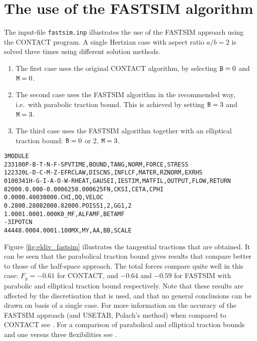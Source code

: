 \documentclass[12pt]{report}
\begin{document}
\section{The use of the FASTSIM algorithm}
\label{sec:ex_fastsim}

The input-file {\tt fastsim.inp} illustrates the use of the FASTSIM
approach using the CONTACT program. A single Hertzian case with aspect
ratio $a/b=2$ is solved three times using different solution methods.
\begin{enumerate}
\item The first case uses the original CONTACT algorithm, by selecting
        ${\tt B}=0$ and ${\tt M}=0$.
\item The second case uses the FASTSIM algorithm in the recommended way,
        i.e.\ with parabolic traction bound. This is achieved by setting
        ${\tt B}=3$ and ${\tt M}=3$.
\item The third case uses the FASTSIM algorithm together with an elliptical
        traction bound: ${\tt B}=0$ or 2, ${\tt M}=3$.
\end{enumerate}
\begin{alltt}\small
% second case: FASTSIM algorithm, parabolical traction bound (M=3, B=3)

 3 MODULE
  233100     P-B-T-N-F-S        PVTIME, BOUND , TANG  , NORM , FORCE, STRESS
  122320     L-D-C-M-Z-E        FRCLAW, DISCNS, INFLCF, MATER, RZNORM, EXRHS
 0100341   H-G-I-A-O-W-R  HEAT, GAUSEI, IESTIM, MATFIL, OUTPUT, FLOW, RETURN
   82000.     0.000     -0.000625   0.000625        FN, CKSI, CETA, CPHI
   0.000      0.400      30000.                     CHI, DQ, VELOC
   0.280      0.280      82000.     82000.          POISS 1,2,  GG 1,2
   1.000      1.000      1.000                      K0_MF,ALFAMF,BETAMF
   -3                                               IPOTCN
   44   44     8.000      4.000      1.100          MX,MY,AA,BB,SCALE
\end{alltt}
Figure \ref{fig:eldiv_fastsim} illustrates the tangential tractions that
are obtained. It can be seen that the parabolical traction bound gives
results that compare better to those of the half-space approach. The total
forces compare quite well in this case: $F_y=-0.61$ for CONTACT, and
$-0.64$ and $-0.59$ for FASTSIM with parabolic and elliptical traction bound
respectively. Note that these results are affected by the discretisation
that is used, and that no general conclusions can be drawn on basis of a
single case. For more information on the accuracy of the FASTSIM approach
(and USETAB, Polach's method) when compared to CONTACT see
\cite{Vollebregt2011a-assessm}. For a comparison of parabolical and elliptical
traction bounds and one versus three flexibilities see
\cite{Vollebregt2010b-fastsim2,Vollebregt2022a-1flex}.
\end{document}
